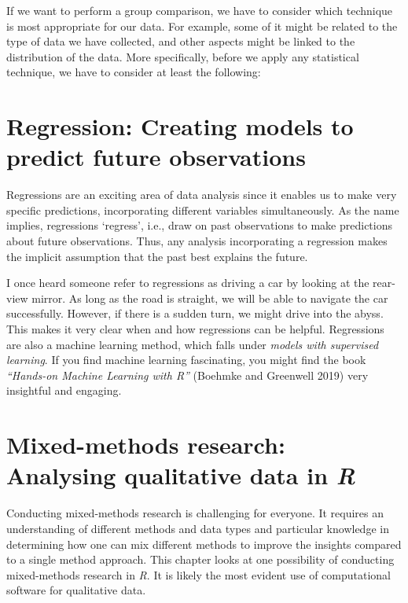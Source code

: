 \documentclass[
  letterpaper,
]{krantz}
\begin{document}
If we want to perform a group comparison, we have to consider which
technique is most appropriate for our data. For example, some of it
might be related to the type of data we have collected, and other
aspects might be linked to the distribution of the data. More
specifically, before we apply any statistical technique, we have to
consider at least the following:


\chapter{Regression: Creating models to predict future
observations}\label{regression}

Regressions are an exciting area of data analysis since it enables us to
make very specific predictions, incorporating different variables
simultaneously. As the name implies, regressions `regress', i.e., draw
on past observations to make predictions about future observations.
Thus, any analysis incorporating a regression makes the implicit
assumption that the past best explains the future.

I once heard someone refer to regressions as driving a car by looking at
the rear-view mirror. As long as the road is straight, we will be able
to navigate the car successfully. However, if there is a sudden turn, we
might drive into the abyss. This makes it very clear when and how
regressions can be helpful. Regressions are also a machine learning
method, which falls under \emph{models with supervised learning}. If you
find machine learning fascinating, you might find the book
\emph{``Hands-on Machine Learning with R''} (Boehmke and Greenwell 2019)
very insightful and engaging.


\chapter{\texorpdfstring{Mixed-methods research: Analysing qualitative
data in
\emph{R}}{Mixed-methods research: Analysing qualitative data in R}}\label{mixed-methods-research}

Conducting mixed-methods research is challenging for everyone. It
requires an understanding of different methods and data types and
particular knowledge in determining how one can mix different methods to
improve the insights compared to a single method approach. This chapter
looks at one possibility of conducting mixed-methods research in
\emph{R}. It is likely the most evident use of computational software
for qualitative data.
\end{document}
